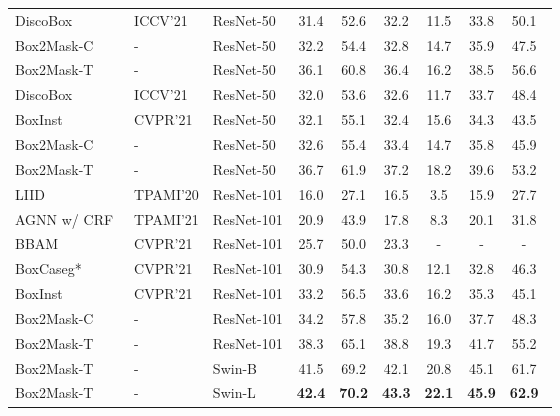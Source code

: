 \documentclass[12pt,onecolumn,letterpaper]{article}
\begin{document}
\begin{table*}[t]
{{\begin{tabular}{lllcccccc}
			DiscoBox~\cite{iccv2021discobox} &ICCV'21 & ResNet-50 & 31.4 & 52.6 & 32.2 & 11.5 & 33.8 & 50.1~ \\
			
			\rowcolor{gray!8}
			Box2Mask-C & - & ResNet-50 & 32.2 & 54.4 & 32.8 & 14.7& 35.9 & 47.5~ \\
			\rowcolor{gray!8}
			Box2Mask-T & - & ResNet-50 & 36.1 & 60.8 & 36.4 & 16.2 & 38.5 & 56.6~  \\
			\midrule
			DiscoBox~\cite{iccv2021discobox} &ICCV'21 & ResNet-50 & 32.0 & 53.6 & 32.6 & 11.7 & 33.7 & 48.4~ \\
			
			BoxInst~\cite{cvpr2021_boxinst} & CVPR'21 & ResNet-50 & 32.1 & 55.1 & 32.4 & 15.6 & 34.3& 43.5~ \\
			
			\rowcolor{gray!8}
			Box2Mask-C & - & ResNet-50 & 32.6 & 55.4& 33.4 & 14.7& 35.8 & 45.9~ \\
			
			\rowcolor{gray!8}
			Box2Mask-T  & -&ResNet-50 & 36.7 & 61.9 & 37.2 & 18.2 & 39.6 & 53.2~ \\
			\midrule
			LIID~\cite{tpami2020leveraging} & TPAMI'20 & ResNet-101 & 16.0 & 27.1 & 16.5 & 3.5 & 15.9 & 27.7~\\
			AGNN w/ CRF~\cite{TPAMI2021affinity} & TPAMI'21 & ResNet-101 & 20.9 & 43.9 & 17.8 & 8.3 & 20.1 & 31.8~\\
			
			BBAM~\cite{cvpr2021bbam} & CVPR'21 &ResNet-101 & 25.7 & 50.0& 23.3 & - & -& -~ \\ 
			
			BoxCaseg*~\cite{cvpr2021boxcaseg} &CVPR'21 & ResNet-101  &30.9 & 54.3 & 30.8 & 12.1 & 32.8 & 46.3~ \\
			
			BoxInst~\cite{cvpr2021_boxinst} & CVPR'21 & ResNet-101 & 33.2 & 56.5& 33.6& 16.2& 35.3& 45.1~ \\
			
			\rowcolor{gray!8}
			Box2Mask-C & - & ResNet-101 & 34.2 & 57.8 & 35.2 & 16.0 & 37.7 & 48.3~ \\
			\rowcolor{gray!8} 
			Box2Mask-T  & - & ResNet-101 & 38.3 & 65.1 & 38.8 & 19.3 & 41.7 & 55.2~  \\

			\rowcolor{gray!8}
			Box2Mask-T & -& Swin-B & 41.5 & 69.2 & 42.1 & 20.8 & 45.1 & 61.7~  \\
			\rowcolor{gray!8}
			Box2Mask-T & - & Swin-L & \textbf{42.4} & \textbf{70.2} & \textbf{43.3} & \textbf{22.1} & \textbf{45.9} & \textbf{62.9}~ \\
			\bottomrule
	\end{tabular}}}
	\label{tab:coco_results}
\end{table*}
\end{document}

